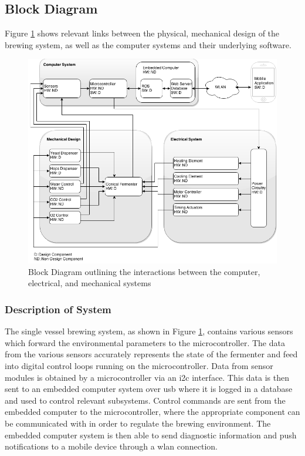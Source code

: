 \documentclass{article}
\begin{document}
\subsection{Block Diagram}\label{sec:block-diagram}
Figure \ref{fig:block} shows relevant links between the physical, mechanical design of the brewing system, as well as the computer systems and their underlying software.

\begin{figure}[H]
\begin{center}
\includegraphics[scale=0.58]{block-diagram.png}
\caption{Block Diagram outlining the interactions between the computer, electrical, and mechanical systems}
\label{fig:block}
\end{center}
\end{figure}

\subsubsection{Description of System}
The single vessel brewing system, as shown in Figure \ref{fig:block}, contains various sensors which forward the environmental parameters to the microcontroller. The data from the various sensors accurately represents the state of the fermenter and feed into digital control loops running on the microcontroller.  Data from sensor modules is obtained by a microcontroller via an \gls{i2c} interface. This data is then sent to an embedded computer system over \gls{usb} where it is logged in a database and used to control relevant subsystems. Control commands are sent from the embedded computer to the microcontroller, where the appropriate component can be communicated with in order to regulate the brewing environment.  The embedded computer system is then able to send diagnostic information and push notifications to a mobile device through a \gls{wlan} connection.
\end{document}
